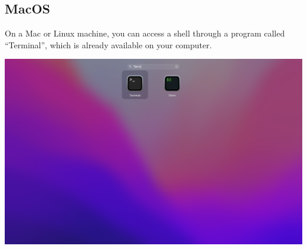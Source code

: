 \documentclass[
  letterpaper,
  DIV=11,
  numbers=noendperiod]{scrreprt}
\begin{document}
\subsection{MacOS}\label{macos}

On a Mac or Linux machine, you can access a shell through a program
called ``Terminal'', which is already available on your computer.

\includegraphics[width=1\linewidth,height=\textheight,keepaspectratio]{images/mac-launchpad-term.png}
\end{document}

